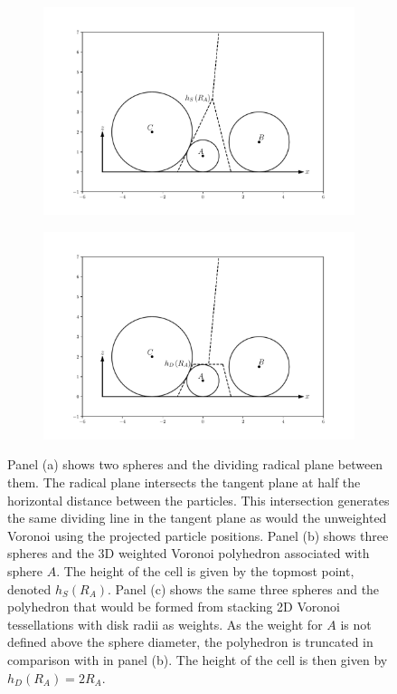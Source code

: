 \begin{figure}[tb]
     \begin{subfigure}[b]{0.48\textwidth}
         \centering
         \includegraphics[width=\textwidth]{./figures/quasi2d/qtd_dia_b.pdf}
         \caption{}
         \label{fig:qtddb}
     \end{subfigure}
     \hfill
     \begin{subfigure}[b]{0.48\textwidth}
         \centering
         \includegraphics[width=\textwidth]{./figures/quasi2d/qtd_dia_c.pdf}
         \caption{}
         \label{fig:qtddc}
     \end{subfigure}
     
     	\caption{Panel (a) shows two spheres and the dividing radical plane between them. The radical plane intersects the tangent plane at half the horizontal distance between the particles. This intersection generates the same dividing line in the tangent plane as would the unweighted Voronoi using the projected particle positions.
Panel (b) shows three spheres and the 3D weighted Voronoi polyhedron associated with sphere $A$. The height of the cell is given by the topmost point, denoted $h_S\left(R_A\right)$. Panel (c) shows the same three spheres and the polyhedron that would be formed from stacking 2D Voronoi tessellations with disk radii as weights. As the weight for $A$ is not defined above the sphere diameter, the polyhedron is truncated in comparison with in panel (b). The height of the cell is then given by $h_D\left(R_A\right)=2R_A$.}
	\label{fig:qtdd}
\end{figure}

